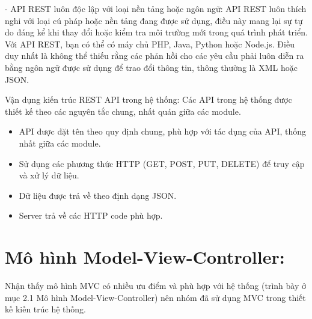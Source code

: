 - API REST luôn độc lập với loại nền tảng hoặc ngôn ngữ: API REST luôn thích nghi với loại cú pháp hoặc nền tảng đang được sử dụng, điều này mang lại sự tự do đáng kể khi thay đổi hoặc kiểm tra môi trường mới trong quá trình phát triển. Với API REST, bạn có thể có máy chủ PHP, Java, Python hoặc Node.js. Điều duy nhất là không thể thiếu rằng các phản hồi cho các yêu cầu phải luôn diễn ra bằng ngôn ngữ được sử dụng để trao đổi thông tin, thông thường là XML hoặc JSON.

Vận dụng kiến trúc REST API trong hệ thống:
Các API trong hệ thống được thiết kế theo các nguyên tắc chung, nhất quán giữa các module.
\begin{itemize}
    \item API được đặt tên theo quy định chung, phù hợp với tác dụng của API, thống nhất giữa các module. %
    \item Sử dụng các phương thức HTTP (GET, POST, PUT, DELETE) để truy cập và xử lý dữ liệu. %
    \item Dữ liệu được trả về theo định dạng JSON. %
    \item Server trả về các HTTP code phù hợp. %
\end{itemize}
\section{Mô hình Model-View-Controller:}
Nhận thấy mô hình MVC có nhiều ưu điểm và phù hợp với hệ thống (trình bày ở mục 2.1 Mô hình Model-View-Controller) nên nhóm đã sử dụng MVC trong thiết kế kiến trúc hệ thống.

